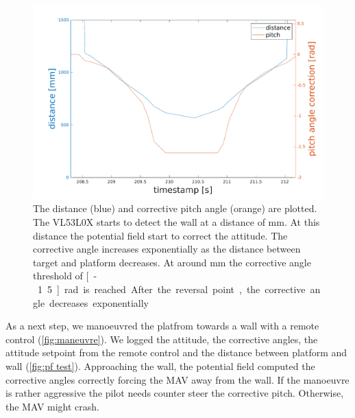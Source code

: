 \begin{figure}
	\centering
	\includegraphics[width=0.9\linewidth]{pictures/plot_pf.pdf}
	\caption{The distance (blue) and corrective pitch angle (orange) are plotted. The VL53L0X starts to detect the wall at a distance of \unit[1200]{mm}. At this distance the potential field start to correct the attitude. The corrective angle increases exponentially as the distance between target and platform decreases. At around \unit[600]{mm} the corrective angle threshold of \unit[-1.5]{rad} is reached. After the reversal point, the corrective angle decreases exponentially}
	\label{fig:pf}
\end{figure}

As a next step, we manoeuvred the platfrom towards a wall with a remote control (\cref{fig:maneuvre}). We logged the attitude, the corrective angles, the attitude setpoint from the remote control and the distance between platform and wall (\cref{fig:pf test}). Approaching the wall, the potential field computed the corrective angles correctly forcing the MAV away from the wall. If the manoeuvre is rather aggressive the pilot needs counter steer the corrective pitch. Otherwise, the MAV might crash.


